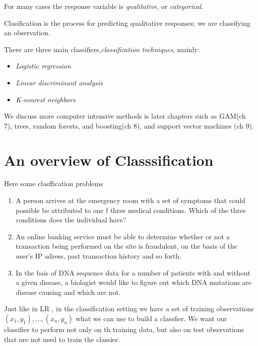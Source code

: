 \documentclass[
  letterpaper,
  DIV=11,
  numbers=noendperiod]{scrreprt}
\providecommand{\tightlist}{%
  \setlength{\itemsep}{0pt}\setlength{\parskip}{0pt}}\usepackage{longtable,booktabs,array}
\begin{document}
For many cases the response variable is \emph{qualitative}, or
\emph{categorical}.

Clasification is the process for predicting qualitative responses; we
are classifying an observation.

There are three main classifiers,\emph{classification techniques},
mainly:

\begin{itemize}
\tightlist
\item
  \emph{Logistic regression}
\item
  \emph{Linear discriminant analysis}
\item
  \emph{K-nearest neighbors}
\end{itemize}

We discuss more computer intensive methods is later chapters such as
GAM(ch 7), trees, random forests, and boosting(ch 8), and support vector
machines (ch 9).

\hypertarget{an-overview-of-classsification}{%
\section{An overview of
Classsification}\label{an-overview-of-classsification}}

Here some clasffication problems

\begin{enumerate}
\def\labelenumi{\arabic{enumi}.}
\item
  A person arrives at the emergency room with a set of symptoms that
  could possible be attributed to one f three medical conditions. Which
  of the three conditions does the individual have?
\item
  An online banking service must be able to determine whether or not a
  transaction being performed on the site is fraudulent, on the basis of
  the user's IP adress, past transaction history and so forth.
\item
  In the bais of DNA sequence data for a number of patients with and
  without a given disease, a biologist would like to figure out which
  DNA mutations are disease causing and which are not.
\end{enumerate}

Just like in LR , in the classification setting we have a set of
training observations \((x_1,y_1), \dots, (x_n,y_n)\) what we can use to
build a classfier. We want our classifier to perform not only on th
training data, but also on test observations that are not used to train
the classier.
\end{document}
